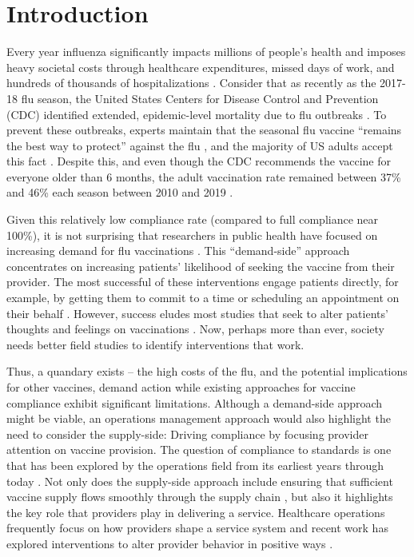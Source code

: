\section{Introduction} 
 Every year influenza significantly impacts millions of people’s health and imposes heavy societal costs through healthcare expenditures, missed days of work, and hundreds of thousands of hospitalizations \citep{Molinari2007,CDC2020_fluBurden}. Consider that as recently as the 2017-18 flu season, the United States Centers for Disease Control and Prevention (CDC) identified extended, epidemic-level mortality due to flu outbreaks \citep{Garten2018}. To prevent these outbreaks, experts maintain that the seasonal flu vaccine “remains the best way to protect” against the flu \citep[p. 544]{Xu2019}, and the majority of US adults accept this fact \citep{NationalFoundationforInfectionsDiseasesNFID2019}. Despite this, and even though the CDC recommends the vaccine for everyone older than 6 months, the adult vaccination rate remained between 37\% and 46\% each season between 2010 and 2019 \citep{CDC2019}.
 
 Given this relatively low compliance rate (compared to full compliance near 100\%), it is not surprising that researchers in public health have focused on increasing demand for flu vaccinations \citep{Brewer2017}. This “demand-side” approach concentrates on increasing patients’ likelihood of seeking the vaccine from their provider. The most successful of these interventions engage patients directly, for example, by getting them to commit to a time \citep{Milkman2011} or scheduling an appointment on their behalf \citep{Chapman2016}. However, success eludes most studies that seek to alter patients’ thoughts and feelings on vaccinations \citep{Brewer2017}. Now, perhaps more than ever, society needs better field studies to identify interventions that work.
 
 Thus, a quandary exists – the high costs of the flu, and the potential implications for other vaccines, demand action while existing approaches for vaccine compliance exhibit significant limitations. Although a demand-side approach might be viable, an operations management approach would also highlight the need to consider the supply-side: Driving compliance by focusing provider attention on vaccine provision. The question of compliance to standards is one that has been explored by the operations field from its earliest years \citep{Taylor1911} through today \citep{Corbett2005,Andritsos2014,Senot2016,Staats2017}. Not only does the supply-side approach include ensuring that sufficient vaccine supply flows smoothly through the supply chain \citep{Deo2009,Cho2010,Arifoglu2012}, but also it highlights the key role that providers play in delivering a service. Healthcare operations frequently focus on how providers shape a service system \citep[e.g.,][]{Tucker2007,Freeman2017} and recent work has explored interventions to alter provider behavior in positive ways \citep{Tsai2015,Song2016,Dai2017,Song2018a}. 
 
